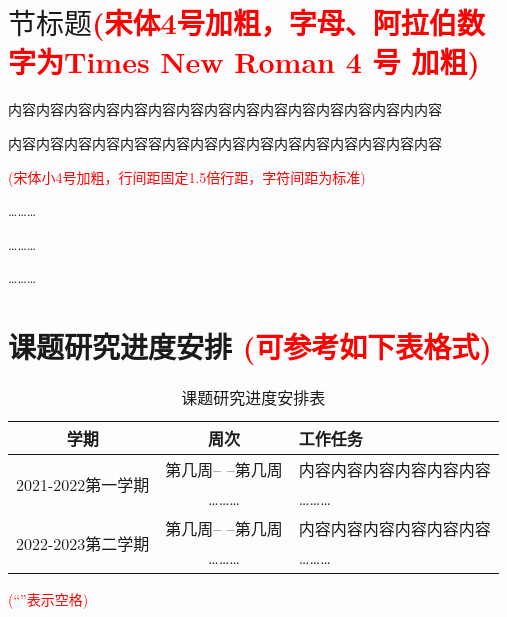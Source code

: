 \documentclass[11pt,a4paper]{article}
\newcommand{\xiaosihao}{\fontsize{12pt}{24pt}\selectfont}
\newcommand{\wuhao}{\fontsize{10.5pt}{18pt}\selectfont}
\newcommand\seccontent{
	\xiaosihao %
    \setlength{\parindent}{2em} %
    \setlength{\parskip}{0pt}
   }
\theoremstyle{definition}
\numberwithin{equation}{section}
\begin{document}
\section{$节标题${\wuhao  \textcolor{red}{(宋体4号加粗，字母、阿拉伯数字为Times New Roman 4 号 加粗)}}}	\seccontent
内容内容内容内容内容内容内容内容内容内容内容内容内容内容内内容

内容内容内容内容内容容内容内容内容内容内容内容内容内容内容内容 

{\wuhao  \textcolor{red}{(宋体小4号加粗，行间距固定1.5倍行距，字符间距为标准)}}

\hspace{15em} \ldots\ldots\ldots

\hspace{15em} \ldots\ldots\ldots

\hspace{15em} \ldots\ldots\ldots










\section{课题研究进度安排 {\wuhao  \textcolor{red}{(可参考如下表格式)}}}

\begin{table}[htpb]
	\seccontent
	\centering
	\caption{课题研究进度安排表}

	\begin{tabular}{ccp{18em}<{\centering}}
		\hline
		学期                                       & 周次                                     & 工作任务                                                                                      \\\hline
		\multirow{2}{5em}{2021-2022第一学期}       & 第几周-- --第几周 & 内容内容内容内容内容内容 \\
		\cline{2-3}
		                                           & \ldots\ldots\ldots                       & \ldots\ldots\ldots                                                                            \\
		\hline\multirow{2}{5em}{2022-2023第二学期} &  第几周-- --第几周 & 内容内容内容内容内容内容  \\
		\cline{2-3}
		                                           & \ldots\ldots\ldots                       & \ldots\ldots\ldots                                                                            \\
		\hline
	\end{tabular}
\end{table}
{\wuhao\textcolor{red}{(``\fbox{\phantom{x}}''表示空格)}}
\end{document}
